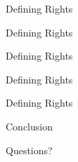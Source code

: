 \documentclass{beamer}
\begin{document}
\begin{frame}[fragile]{Defining Rights}
\end{frame}
\begin{frame}[fragile]{Defining Rights}
\end{frame}
\begin{frame}[fragile]{Defining Rights}
\end{frame}
\begin{frame}[fragile]{Defining Rights}
\end{frame}
\begin{frame}[fragile]{Defining Rights}
\end{frame}
\begin{frame}[fragile]{Conclusion}
\end{frame}
\begin{frame}[fragile]{Questions?}
\end{frame}
\end{document}
